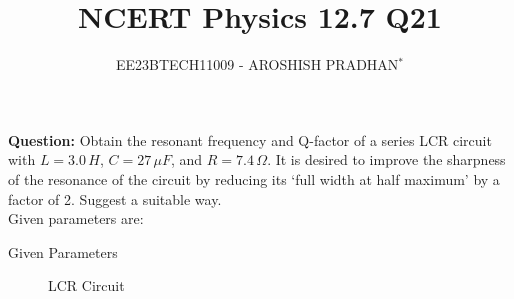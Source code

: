 \documentclass[journal,12pt,twocolumn]{IEEEtran}
\theoremstyle{remark}
\begin{document}

\vspace{3cm}

\title{NCERT Physics 12.7 Q21}
\author{EE23BTECH11009 - AROSHISH PRADHAN$^{*}$%
}
\maketitle
\newpage
\bigskip
\textbf{Question:} 
Obtain the resonant frequency and Q-factor of a series LCR circuit with $L = 3.0\, H$, $C = 27\, \mu F$, and $R = 7.4\, \Omega$. It is desired to improve the sharpness of the resonance of the circuit by reducing its `full width at half maximum' by a factor of 2. Suggest a suitable way.\\

\solution
Given parameters are:
\begin{table}[!h]
    \centering
    \resizebox{\columnwidth}{!}{
    }
    \vspace{6 pt}
    \caption{Given Parameters}
    \label{tab:my_label}
\end{table}
\begin{figure}[!h]
 \centering
    
    \caption{LCR Circuit}
    \label{fig:enter-label}
\end{figure}
\end{document}
